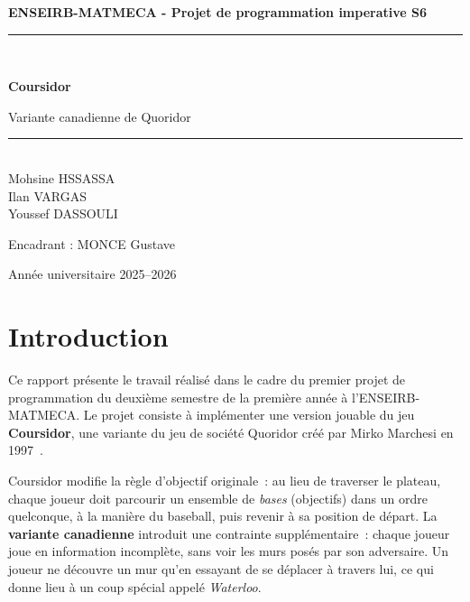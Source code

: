 \documentclass[12pt,a4paper]{article}
\begin{document}
\begin{titlepage}
  \centering
  \vspace*{2cm}

  {\Large\bfseries ENSEIRB-MATMECA - Projet de programmation imperative S6\par}
  \vspace{1cm}
  \rule{\linewidth}{0.5pt}\\[0.4cm]
  {\Huge\bfseries Coursidor\par}
  {\large Variante canadienne de Quoridor\par}
  \rule{\linewidth}{0.5pt}\\[1cm]

  \vspace{1cm}
  {\large
    Mohsine HSSASSA \\ %
    Ilan VARGAS \\
    Youssef DASSOULI \\
  }

  \vspace{1.5cm}
  {\large Encadrant : MONCE Gustave\par}

  \vfill
  {\large Année universitaire 2025--2026\par}
\end{titlepage}

\tableofcontents
\newpage

\section*{Introduction}
\label{sec:intro}

Ce rapport présente le travail réalisé dans le cadre du premier projet de
programmation du deuxième semestre de la première année à l'ENSEIRB-MATMECA. Le projet
consiste à implémenter une version jouable du jeu \textbf{Coursidor},
une variante du jeu de société Quoridor créé par Mirko Marchesi en
1997~\cite{quoridor_wiki}.

Coursidor modifie la règle d'objectif originale~: au lieu de traverser
le plateau, chaque joueur doit parcourir un ensemble de \emph{bases}
(objectifs) dans un ordre quelconque, à la manière du baseball, puis
revenir à sa position de départ. La \textbf{variante canadienne}
introduit une contrainte supplémentaire~: chaque joueur joue en
information incomplète, sans voir les murs posés par son adversaire.
Un joueur ne découvre un mur qu'en essayant de se déplacer à travers
lui, ce qui donne lieu à un coup spécial appelé \emph{Waterloo}.
\end{document}
